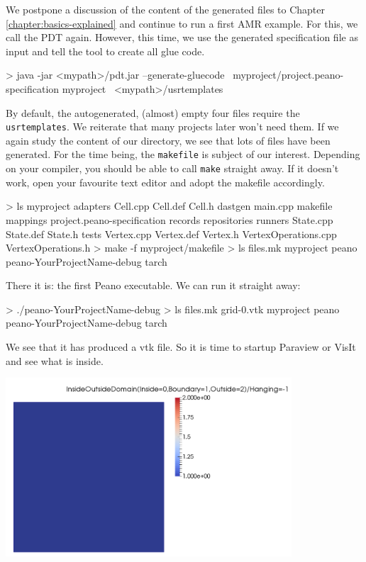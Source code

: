 We postpone a discussion of the content of the generated files to Chapter
\ref{chapter:basics-explained} and continue to run a first AMR example.
For this, we call the PDT again.
However, this time, we use the generated specification file as input and tell
the tool to create all glue code.


\begin{code}
> java -jar <mypath>/pdt.jar --generate-gluecode \
  myproject/project.peano-specification myproject \
  <mypath>/usrtemplates
\end{code}

\noindent
By default, the autogenerated, (almost) empty four files require the
\texttt{usrtemplates}.
We reiterate that many projects later won't need them.
If we again study the content of our directory, we see that lots of files have
been generated.
For the time being, the \texttt{makefile} is subject of our interest.
Depending on your compiler, you should be able to call \texttt{make} straight
away. 
If it doesn't work, open your favourite text editor and adopt the makefile
accordingly.
\begin{code}
> ls myproject
  adapters   Cell.cpp              Cell.def      
  Cell.h     dastgen               main.cpp     
  makefile   mappings              project.peano-specification  
  records    repositories          runners 
  State.cpp  State.def             State.h
  tests      Vertex.cpp            Vertex.def    
  Vertex.h   VertexOperations.cpp  VertexOperations.h
> make -f myproject/makefile
> ls
  files.mk  myproject  peano  peano-YourProjectName-debug  tarch
\end{code}


\noindent
There it is: the first Peano executable. We can run it straight away:
\begin{code}
> ./peano-YourProjectName-debug
> ls
  files.mk                     grid-0.vtk  myproject  peano  
  peano-YourProjectName-debug  tarch
\end{code}

\noindent
We see that it has produced a vtk file. So it is time to startup Paraview or
VisIt and see what is inside.

\begin{center}
  \includegraphics[width=0.8\textwidth]{10_quickstart/screenshot00.png}
\end{center}

